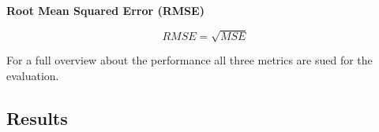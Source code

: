 \textbf{Root Mean Squared Error (RMSE)}

\begin{tcolorbox}[arc=0pt,boxrule=0.5pt]
\begin{equation}
\label{eq:rmse}
RMSE = \sqrt{MSE}
\end{equation}
\end{tcolorbox}

For a full overview about the performance all three metrics are sued for the
evaluation.




\subsection{Results}\label{subsec:results}


